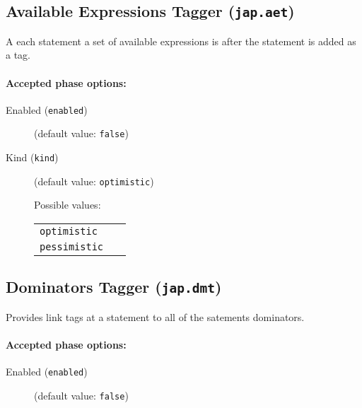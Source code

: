 \documentclass{article}
\begin{document}
\subsection{Available Expressions Tagger ({\tt jap.aet})}
A each statement a set of available expressions is after the statement is added as a tag.

\paragraph{Accepted phase options:} 

\begin{description}

\item[Enabled ({\tt enabled})]
(default value: {\tt false})






\item[Kind ({\tt kind})]
(default value: {\tt optimistic})







Possible values:\\
\begin{longtable}{p{1in}p{4in}}

{\tt optimistic }
&
\\

{\tt pessimistic }
&
\\

\end{longtable}


\end{description}

\subsection{Dominators Tagger ({\tt jap.dmt})}
Provides link tags at a statement to all of the satements dominators.

\paragraph{Accepted phase options:} 

\begin{description}

\item[Enabled ({\tt enabled})]
(default value: {\tt false})






\end{description}
\end{document}
